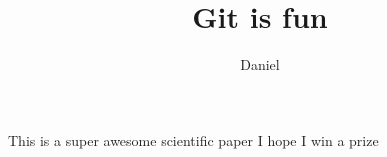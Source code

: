 \documentclass[10pt]{article}
\author{Daniel}
\title{Git is fun}
\begin{document}
	\makefile

	This is a super awesome scientific paper
	I hope I win a prize
\end{document}
